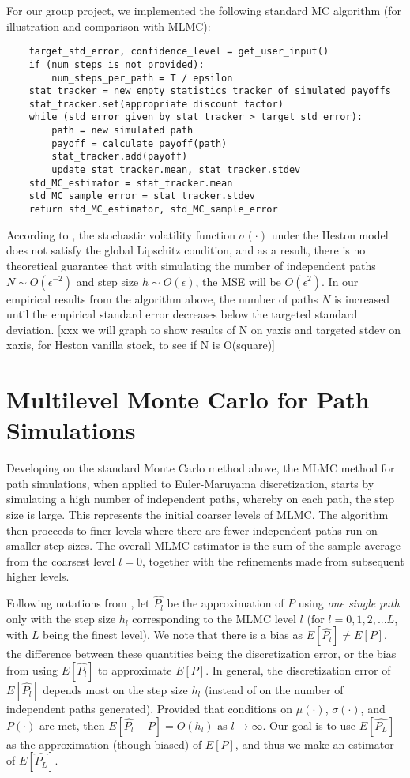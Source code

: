 \documentclass{article}
\begin{document}
    For our group project, we implemented the following standard MC algorithm (for illustration and comparison with MLMC):
    \begin{lstlisting}
	target_std_error, confidence_level = get_user_input()
    if (num_steps is not provided):
        num_steps_per_path = T / epsilon
    stat_tracker = new empty statistics tracker of simulated payoffs
    stat_tracker.set(appropriate discount factor)
    while (std error given by stat_tracker > target_std_error):
        path = new simulated path
        payoff = calculate payoff(path)
        stat_tracker.add(payoff)
        update stat_tracker.mean, stat_tracker.stdev
    std_MC_estimator = stat_tracker.mean
    std_MC_sample_error = stat_tracker.stdev
    return std_MC_estimator, std_MC_sample_error
    \end{lstlisting}
    
    According to \cite{giles08}, the stochastic volatility function $\sigma(\cdot)$ under the Heston model does not satisfy the global Lipschitz condition, and as a result, there is no theoretical guarantee that with simulating the number of independent paths $N \sim O(\epsilon^{-2})$ and step size $h \sim O(\epsilon)$, the MSE will be $O(\epsilon^2)$. In our empirical results from the algorithm above, the number of paths $N$ is increased until the empirical standard error decreases below the targeted standard deviation. [xxx we will graph to show results of N on yaxis and targeted stdev on xaxis, for Heston vanilla stock, to see if N is O(square)]	

\section{Multilevel Monte Carlo for Path Simulations}
	Developing on the standard Monte Carlo method above, the MLMC method for path simulations, when applied to Euler-Maruyama discretization, starts by simulating a high number of independent paths, whereby on each path, the step size is large. This represents the initial coarser levels of MLMC. The algorithm then proceeds to finer levels where there are fewer independent paths run on smaller step sizes. The overall MLMC estimator is the sum of the sample average from the coarsest level $l=0$, together with the refinements made from subsequent higher levels.
	
	Following notations from \cite{giles08}, let $\widehat{P_l}$ be the approximation of $P$ using \textit{one single path} only with the step size $h_l$ corresponding to the MLMC level $l$ (for $l=0,1,2,...L$, with $L$ being the finest level). We note that there is a bias as $E[\widehat{P_l}] \neq E[P]$, the difference between these quantities being the discretization error, or the bias from using $E[\widehat{P_l}]$ to approximate $E[P]$. In general, the discretization error of $E[\widehat{P_l}]$ depends most on the step size $h_l$ (instead of on the number of independent paths generated). Provided that  conditions on $\mu(\cdot)$, $\sigma(\cdot)$, and $P(\cdot)$ are met, then $E[\widehat{P_l} - P] = O(h_l)$ as $l\rightarrow \infty$. Our goal is to use $E[\widehat{P_L}]$ as the approximation (though biased) of $E[P]$, and thus we make an estimator of $E[\widehat{P_L}]$.
	
\end{document}
